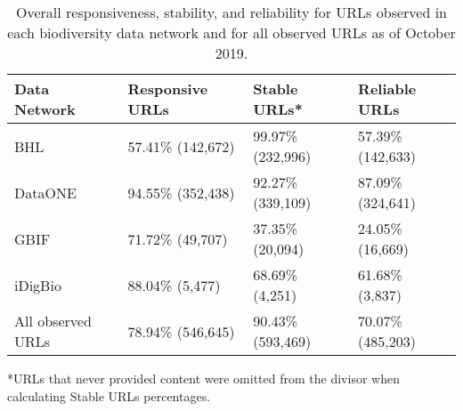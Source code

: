 \begin{table}[!ht]
\begin{adjustwidth}{-1.5in}{0in} %
\centering
\caption{Overall responsiveness, stability, and reliability for URLs observed in each biodiversity data network and for all observed URLs as of October 2019.
}
\begin{tabular}{|l|l|l|l|}
\hline
{\bf Data Network} & {\bf Responsive URLs} & {\bf Stable URLs*} & {\bf Reliable URLs} \\ \hline
BHL & 57.41\% (142,672) & 99.97\% (232,996) & 57.39\% (142,633) \\ \hline
DataONE & 94.55\% (352,438) & 92.27\% (339,109) & 87.09\% (324,641) \\ \hline
GBIF & 71.72\% (49,707) & 37.35\% (20,094) & 24.05\% (16,669) \\ \hline
iDigBio & 88.04\% (5,477) & 68.69\% (4,251) & 61.68\% (3,837)  \\ \hline
All observed URLs & 78.94\% (546,645) & 90.43\% (593,469) & 70.07\% (485,203) \\ \hline
\end{tabular}
\label{table1}
\end{adjustwidth}
\end{table}

*URLs that never provided content were omitted from the divisor when calculating Stable URLs percentages.

